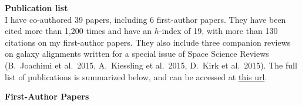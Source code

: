 \documentclass{article}
\begin{document}
% 

\noindent
{\bf\huge Publication list}\\

\noindent
I have co-authored 39 papers, including 6 first-author papers. They have been 
cited more than 1,200 times and have an $h$-index of 19, with more than 130 
citations on my first-author papers. They also include three companion reviews on 
galaxy alignments written for a special issue of Space Science Reviews (B.\ 
Joachimi et al.\ 2015, A.\ Kiessling et al.\ 2015, D.\ Kirk et al.\ 2015). The 
full list of publications is summarized below, and can be accessed at
{\color{blue}\href{https://goo.gl/LAu9G4}{this url}}.

\vspace{0.4cm}
\noindent
{\bf\Large First-Author Papers}\\

\newcommand{\etal}[1]{et al.\ (#1 co-authors)}
\end{document}
